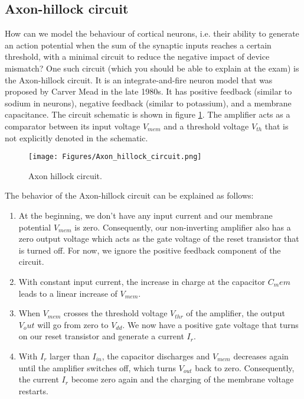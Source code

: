 \subsection{Axon-hillock circuit}

How can we model the behaviour of cortical neurons, i.e. their ability to generate an action potential when the sum of the synaptic inputs reaches a certain threshold, with a minimal circuit to reduce the negative impact of device mismatch? One such circuit (which you should be able to explain at the exam) is the Axon-hillock circuit. It is an integrate-and-fire neuron model that was proposed by Carver Mead in the late 1980s. It has positive feedback (similar to sodium in neurons), negative feedback (similar to potassium), and a membrane capacitance. The circuit schematic is shown in figure \ref{fig:axonHillockCircuit}. The amplifier acts as a comparator between its input voltage $V_{mem}$ and a threshold voltage $V_{th}$ that is not explicitly denoted in the schematic.\\

\begin{figure}
    \centering
    \texttt{[image: Figures/Axon\_hillock\_circuit.png]}
    \caption{Axon hillock circuit.}
    \label{fig:axonHillockCircuit}
\end{figure}

The behavior of the Axon-hillock circuit can be explained as follows:

\begin{enumerate}
    \item At the beginning, we don't have any input current and our membrane potential $V_{mem}$ is zero. Consequently, our non-inverting amplifier also has a zero output voltage which acts as the gate voltage of the reset transistor that is turned off. For now, we ignore the positive feedback component of the circuit.
    \item With constant input current, the increase in charge at the capacitor $C_mem$ leads to a linear increase of $V_{mem}$.
    \item When $V_{mem}$ crosses the threshold voltage $V_{thr}$ of the amplifier, the output $V_out$ will go from zero to $V_{dd}$. We now have a positive gate voltage that turns on our reset transistor and generate a current $I_r$.
    \item With $I_r$ larger than $I_{in}$, the capacitor discharges and $V_{mem}$ decreases again until the amplifier switches off, which turns $V_{out}$ back to zero. Consequently, the current $I_r$ become zero again and the charging of the membrane voltage restarts.
\end{enumerate}


